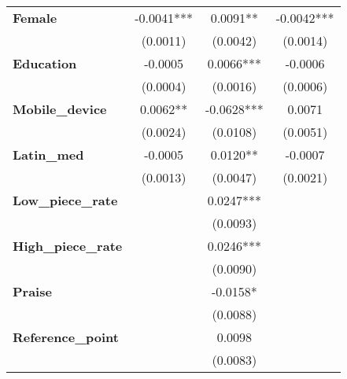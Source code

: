 \begin{center}
\begin{tabular}{lccc}
\textbf{Female}                              &     -0.0041***     &     0.0091**    &             -0.0042***             \\
\textbf{ }                                   &      (0.0011)      &     (0.0042)    &              (0.0014)              \\
\textbf{Education}                           &      -0.0005       &    0.0066***    &              -0.0006               \\
\textbf{ }                                   &      (0.0004)      &     (0.0016)    &              (0.0006)              \\
\textbf{Mobile\_device}                      &      0.0062**      &    -0.0628***   &               0.0071               \\
\textbf{ }                                   &      (0.0024)      &     (0.0108)    &              (0.0051)              \\
\textbf{Latin\_med}                          &      -0.0005       &     0.0120**    &              -0.0007               \\
\textbf{ }                                   &      (0.0013)      &     (0.0047)    &              (0.0021)              \\
\textbf{Low\_piece\_rate}                    &                    &    0.0247***    &                                    \\
\textbf{ }                                   &                    &     (0.0093)    &                                    \\
\textbf{High\_piece\_rate}                   &                    &    0.0246***    &                                    \\
\textbf{ }                                   &                    &     (0.0090)    &                                    \\
\textbf{Praise}                              &                    &     -0.0158*    &                                    \\
\textbf{ }                                   &                    &     (0.0088)    &                                    \\
\textbf{Reference\_point}                    &                    &      0.0098     &                                    \\
\textbf{ }                                   &                    &     (0.0083)    &                                    \\

\end{tabular}
\end{center}
